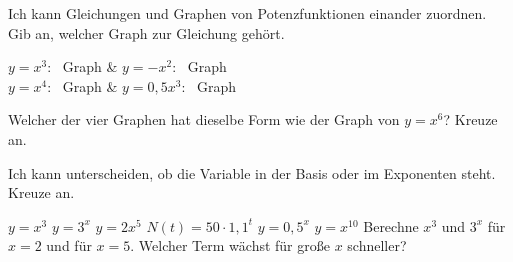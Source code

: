 \begin{aufgabe}{Ich kann Gleichungen und Graphen von Potenzfunktionen einander zuordnen. Gib an, welcher Graph zur Gleichung gehört.}

\begin{ksys}[xmin=-2,xmax=2,ymin=-4,ymax=4,ablesen]
\end{ksys}\hspace{0.8cm}\begin{ksys}[xmin=-2,xmax=2,ymin=-4,ymax=4,ablesen]
\end{ksys}\hspace{0.8cm}\begin{ksys}[xmin=-2,xmax=2,ymin=-4,ymax=4,ablesen]
\end{ksys}\hspace{0.8cm}\begin{ksys}[xmin=-2,xmax=2,ymin=-4,ymax=4,ablesen]
\end{ksys}

\begin{teilezwei}
\tz $y = x^3$: \ Graph \leerfeld & \tz $y = -x^2$: \ Graph \leerfeld \\
\tz $y = x^4$: \ Graph \leerfeld & \tz $y = 0{,}5x^3$: \ Graph \leerfeld \\
\end{teilezwei}
\begin{teile}
\teil Welcher der vier Graphen hat dieselbe Form wie der Graph von $y = x^6$? Kreuze an. \\ 
\end{teile}
\end{aufgabe}

\begin{aufgabe}{Ich kann unterscheiden, ob die Variable in der Basis oder im Exponenten steht. Kreuze an.}
\begin{teile}
\teil $y = x^3$ \hfill {}
\teil $y = 3^x$ \hfill {}
\teil $y = 2x^5$ \hfill {}
\teil $N(t) = 50 \cdot 1{,}1^t$ \hfill {}
\teil $y = 0{,}5^x$ \hfill {}
\teil $y = x^{10}$ \hfill {}
\teil Berechne $x^3$ und $3^x$ für $x = 2$ und für $x = 5$. Welcher Term wächst für große $x$ schneller?
\end{teile}
\end{aufgabe}

